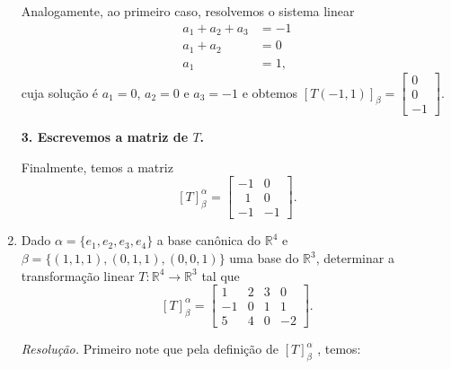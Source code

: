 \begin{enumerate}
Analogamente, ao primeiro caso, resolvemos  o sistema linear
\begin{align*}
a_1+a_2+a_3 &=-1 \\
a_1+a_2 &=0 \\
a_1&= 1,
\end{align*}
cuja solução é $a_1=0$, $a_2=0$ e $a_3=-1$ e  obtemos
$[T(-1,1)]_{\beta}=\left[ \begin{array}{c}0 \\0\\ -1\end{array} \right]$.

\textbf{3. Escrevemos a matriz de $T$.}

Finalmente, temos a matriz $$[T]_{\beta}^{\alpha}=\left[ \begin{array}{cc}-1 &0 \\ \;\;1 &0  \\  -1& -1 \end{array} \right].$$


\item Dado  $\alpha =\{e_1, e_2, e_3, e_4\}$ a base canônica do $ \mathbb{R}^4 $ e $\beta=\{(1,1,1), (0,1,1),(0,0,1)\}$ uma base do $ \mathbb{R}^3$, determinar a transformação linear  $T: \mathbb{R}^4 \rightarrow \mathbb{R}^3$  tal que
$$[T]_{\beta}^{\alpha}=\left[ \begin{array}{cccc}1 &2&3&0 \\ -1 &0&1&1  \\  5&4&0&-2 \end{array} \right].$$

\vspace{0.5cm}
\noindent\textit{Resolução.}  Primeiro note que pela definição de  $[T]_{\beta}^{\alpha}$ , temos:


\end{enumerate}
